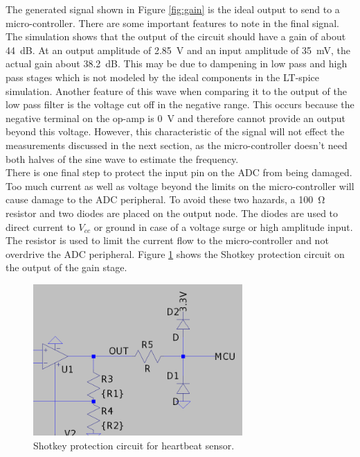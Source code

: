 \documentclass[CMPE]{../KGCOEReport}
\begin{document}
	The generated signal shown in Figure \ref{fig:gain} is the ideal output to
	send to a micro-controller. There are some important features to note in the
	final signal. The simulation shows that the output of the circuit should have
	a gain of about \SI{44}{\dB}. At an output  amplitude of \SI{2.85}{\volt} and
	an input amplitude of \SI{35}{\milli\volt}, the actual gain about \SI{38.2}{\dB}.
	This may be due to dampening in low pass and high pass stages which is not modeled
	by the ideal components in the LT-spice simulation. Another feature of this wave
	when comparing it to the output of the low pass filter is the voltage cut off
	in the negative range. This occurs because the negative terminal on the op-amp
	is \SI{0}{\volt} and therefore cannot provide an output beyond this voltage.
	However, this characteristic of the signal will not effect the measurements
	discussed in the next section, as the micro-controller doesn't need both halves
	of the sine wave to estimate the frequency.\\

	There is one final step to protect the input pin
	on the ADC from being damaged. Too much current as well as voltage beyond the
	limits on the micro-controller will cause damage to the ADC peripheral. To avoid
	these two hazards, a \SI{100}{\ohm} resistor and two diodes are placed on the output
	node. The diodes are used to direct current to $V_{cc}$ or
	ground in case of a voltage surge or high amplitude input. The resistor is used to
	limit the current flow to the micro-controller and not overdrive the ADC peripheral.
	Figure \ref{fig:shotkey} shows the Shotkey protection circuit on the output
	of the gain stage.

	\begin{figure}[h!]
        \centering
        \includegraphics[width=8cm]{shotkey}
        \caption{Shotkey protection circuit for heartbeat sensor.}
        \label{fig:shotkey}
	\end{figure}
\end{document}
